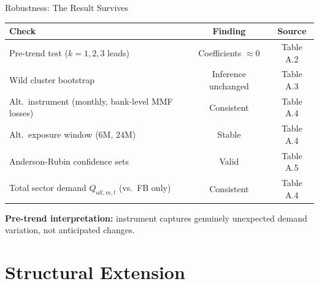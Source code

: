 \documentclass[aspectratio=169, 10pt]{beamer}
\begin{document}
\begin{frame}{Robustness: The Result Survives}

  \begin{center}
  \begin{tabular}{lcc}
    \toprule
    Check & Finding & Source \\
    \midrule
    Pre-trend test ($k = 1,2,3$ leads) & Coefficients $\approx 0$ & Table A.2 \\
    Wild cluster bootstrap & Inference unchanged & Table A.3 \\
    Alt.\ instrument (monthly, bank-level MMF losses) & Consistent & Table A.4 \\
    Alt.\ exposure window (6M, 24M) & Stable & Table A.4 \\
    Anderson-Rubin confidence sets & Valid & Table A.5 \\
    Total sector demand $Q_{all,m,t}$ (vs.\ FB only) & Consistent & Table A.4 \\
    \bottomrule
  \end{tabular}
  \end{center}

  \bigskip

  \textbf{Pre-trend interpretation:} instrument captures genuinely unexpected demand variation,
  not anticipated changes.

\end{frame}

\section{Structural Extension}
\end{document}
